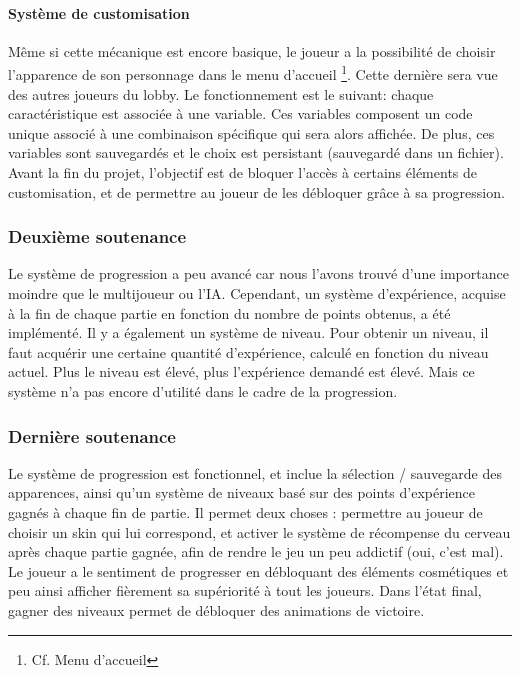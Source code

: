         \paragraph{Système de customisation}
        Même si cette mécanique est encore basique, le joueur a la possibilité de choisir l'apparence de son personnage dans le menu d'accueil
        \footnote{Cf. Menu d'accueil}. Cette dernière sera vue des autres joueurs du lobby. Le fonctionnement est le suivant: chaque caractéristique est associée 
        à une variable. Ces variables composent un code unique associé à une combinaison spécifique qui sera alors affichée. De plus, ces variables sont 
        sauvegardés et le choix est persistant (sauvegardé dans un fichier). Avant la fin du projet, l'objectif est de bloquer l'accès à certains éléments de 
        customisation, et de permettre au joueur de les débloquer grâce à sa progression.

	
	\subsubsection{Deuxième soutenance}

        Le système de progression a peu avancé car nous l'avons trouvé d'une importance moindre que le multijoueur ou l'IA.
        Cependant, un système d'expérience, acquise à la fin de chaque partie en fonction du nombre de
        points obtenus, a été implémenté. Il y a également un système de niveau. Pour obtenir un niveau, il faut
        acquérir une certaine quantité d'expérience, calculé en fonction du niveau actuel. Plus le niveau est élevé,
        plus l'expérience demandé est élevé. Mais ce système n'a pas encore d'utilité dans le cadre de la progression.


	\subsubsection{Dernière soutenance}

        Le système de progression est fonctionnel, et inclue la sélection / sauvegarde des apparences, ainsi qu'un système de niveaux basé sur des points d'expérience 
        gagnés à chaque fin de partie. Il permet deux choses : permettre au joueur de choisir un skin qui lui correspond, et activer 
        le système de récompense du cerveau après chaque partie gagnée, afin de rendre le jeu un peu addictif (oui, c'est mal). Le joueur a le sentiment de progresser
		en débloquant des éléments cosmétiques et peu ainsi afficher fièrement sa supériorité à tout les joueurs. Dans l'état final, gagner des niveaux permet de débloquer
		des animations de victoire.
